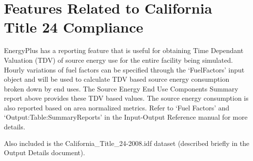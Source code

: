 \section{Features Related to California Title 24 Compliance}\label{features-related-to-california-title-24-compliance}

EnergyPlus has a reporting feature that is useful for obtaining Time Dependant Valuation (TDV) of source energy use for the entire facility being simulated. Hourly variations of fuel factors can be specified through the `FuelFactors' input object and will be used to calculate TDV based source energy consumption broken down by end uses. The Source Energy End Use Components Summary report above provides these TDV based values. The source energy consumption is also reported based on area normalized metrics. Refer to `Fuel Factors' and `Output:Table:SummaryReports' in the Input-Output Reference manual for more details.

Also included is the California\_Title\_24-2008.idf dataset (described briefly in the Output Details document).
